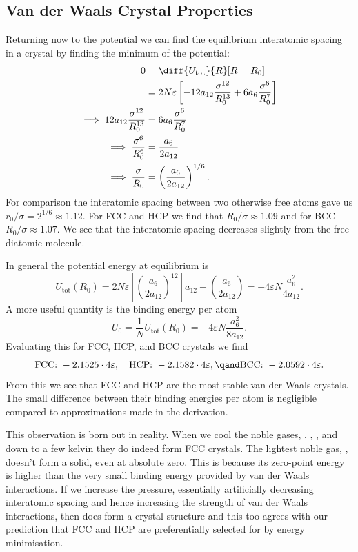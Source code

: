 \documentclass[fleqn]{NotesClass}
\newcommand*{\tot}{\mathrm{tot}}
\begin{document}
    \subsection{Van der Waals Crystal Properties}
    Returning now to the potential we can find the equilibrium interatomic spacing in a crystal by finding the minimum of the potential:
    \begin{align}
        0 &= \diff{U_{\tot}}{R}[R=R_0]\\
        &= 2N\varepsilon\left[ -12a_{12}\frac{\sigma^{12}}{R_0^{13}} + 6a_6\frac{\sigma^{6}}{R_0^{7}} \right]\\
        \implies 12a_{12}\frac{\sigma^{12}}{R_0^{13}} &= 6a_6\frac{\sigma^{6}}{R_0^{7}}\\
        \implies \frac{\sigma^6}{R_0^6} &= \frac{a_{6}}{2a_{12}}\\
        \implies \frac{\sigma}{R_0} &= \left( \frac{a_6}{2a_{12}} \right)^{1/6}.
    \end{align}
    For comparison the interatomic spacing between two otherwise free atoms gave us \(r_0/\sigma = 2^{1/6} \approx 1.12\).
    For FCC and HCP we find that \(R_0/\sigma \approx 1.09\) and for BCC \(R_0/\sigma \approx 1.07\).
    We see that the interatomic spacing decreases slightly from the free diatomic molecule.
    
    In general the potential energy at equilibrium is
    \begin{equation}
        U_{\tot}(R_0) = 2N\varepsilon\left[ \left( \frac{a_6}{2a_{12}} \right)^{12} \right]a_{12} - \left( \frac{a_6}{2a_{12}} \right) = -4\varepsilon N\frac{a_6^2}{4a_{12}}.
    \end{equation}
    A more useful quantity is the binding energy per atom
    \begin{equation}
        U_0 = \frac{1}{N}U_{\tot}(R_0) = -4\varepsilon N\frac{a_6^2}{8a_{12}}.
    \end{equation}
    Evaluating this for FCC, HCP, and BCC crystals we find
    \begin{equation}
        \text{FCC:} \ -2.1525\cdot 4\varepsilon, \quad \text{HCP:} \ -2.1582\cdot 4\varepsilon, \qand \text{BCC:} \ -2.0592\cdot 4\varepsilon.
    \end{equation}
    From this we see that FCC and HCP are the most stable van der Waals crystals.
    The small difference between their binding energies per atom is negligible compared to approximations made in the derivation.
    
    This observation is born out in reality.
    When we cool the noble gases, , , , and  down to a few kelvin they do indeed form FCC crystals.
    The lightest noble gas, , doesn't form a solid, even at absolute zero.
    This is because its zero-point energy is higher than the very small binding energy provided by van der Waals interactions.
    If we increase the pressure, essentially artificially decreasing interatomic spacing and hence increasing the strength of van der Waals interactions, then  does form a crystal structure and this too agrees with our prediction that FCC and HCP are preferentially selected for by energy minimisation.
    
\end{document}

